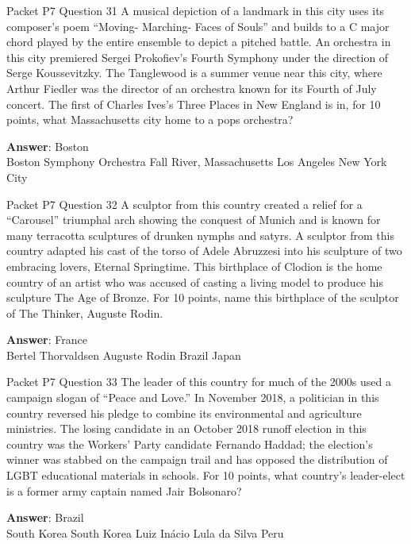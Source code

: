 \begin{frame}{Packet P7 Question 31}
A musical depiction of a landmark in this city uses its composer’s poem “Moving- Marching- Faces of Souls” and builds to a C major chord played by the entire ensemble to depict a pitched battle. An orchestra in this city premiered Sergei Prokofiev’s Fourth Symphony under the direction of Serge Koussevitzky. The Tanglewood is a summer venue   near this city, where Arthur Fiedler was the director of an orchestra known for its Fourth of July concert. The first of Charles Ives’s Three Places in New England is in, for 10 points, what Massachusetts city home to a pops orchestra?      

\textbf{Answer}: Boston\\
 Boston Symphony Orchestra
 Fall River, Massachusetts
 Los Angeles
 New York City
\end{frame}

\begin{frame}{Packet P7 Question 32}
A sculptor from this country   created a relief for a “Carousel” triumphal arch showing the conquest of Munich and is known for many terracotta sculptures of drunken nymphs and satyrs. A sculptor from this country adapted his cast of the torso of Adele Abruzzesi into his sculpture of two embracing lovers, Eternal Springtime. This birthplace of Clodion is the home country of an artist who was accused of casting a living model   to produce his sculpture The Age of Bronze. For 10 points, name this birthplace of the sculptor of The Thinker, Auguste Rodin.    

\textbf{Answer}: France\\
 Bertel Thorvaldsen
 Auguste Rodin
 Brazil
 Japan
\end{frame}

\begin{frame}{Packet P7 Question 33}
The leader of this country for much of the 2000s used a campaign slogan of “Peace and Love.” In November 2018, a politician in this country reversed his pledge to combine its environmental and agriculture ministries. The losing candidate in an October 2018 runoff election in this country was the Workers’ Party candidate Fernando Haddad; the election’s winner was stabbed on the campaign trail and has opposed the distribution of LGBT educational materials in schools. For 10 points, what country’s leader-elect is a former army captain named Jair Bolsonaro?        

\textbf{Answer}: Brazil\\
 South Korea
 South Korea
 Luiz Inácio Lula da Silva
 Peru
\end{frame}

